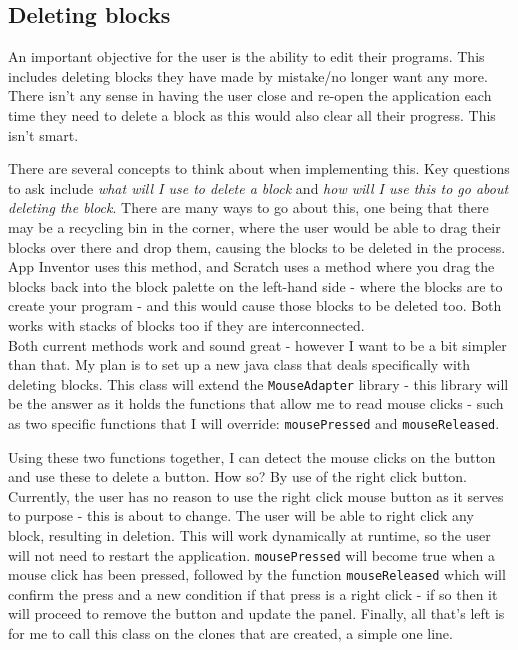 \documentclass[a4paper, 12pt]{article}
\begin{document}
        \clearpage
        \subsection{Deleting blocks}
            An important objective for the user is the ability to edit their programs. This includes
            deleting blocks they have made by mistake/no longer want any more. There isn't any
            sense in having the user close and re-open the application each time they need to
            delete a block as this would also clear all their progress. This isn't smart.

            There are several concepts to think about when implementing this. Key questions to
            ask include \textit{what will I use to delete a block} and \textit{how will I use this
            to go about deleting the block}. There are many ways to go about this, one being that there
            may be a recycling bin in the corner, where the user would be able to drag their blocks over
            there and drop them, causing the blocks to be deleted in the process. App Inventor uses this
            method, and Scratch uses a method where you drag the blocks back into the block palette on
            the left-hand side - where the blocks are to create your program - and this would cause those
            blocks to be deleted too. Both works with stacks of blocks too if they are interconnected. \\

            Both current methods work and sound great - however I want to be a bit simpler than that.
            My plan is to set up a new java class that deals specifically with deleting blocks. This class
            will extend the \texttt{MouseAdapter} library - this library will be the answer as it holds
            the functions that allow me to read mouse clicks - such as two specific functions that I will
            override: \texttt{mousePressed} and \texttt{mouseReleased}.

            Using these two functions together, I can detect the mouse clicks on the button and use these
            to delete a button. How so? By use of the right click button. Currently, the user has no
            reason to use the right click mouse button as it serves to purpose - this is about to change.
            The user will be able to right click any block, resulting in deletion. This will work
            dynamically at runtime, so the user will not need to restart the application.
            \texttt{mousePressed} will become true when a mouse click has been pressed, followed by the
            function \texttt{mouseReleased} which will confirm the press and a new condition if that press
            is a right click - if so then it will proceed to remove the button and update the panel. Finally,
            all that's left is for me to call this class on the clones that are created, a simple one line. \\
\end{document}
